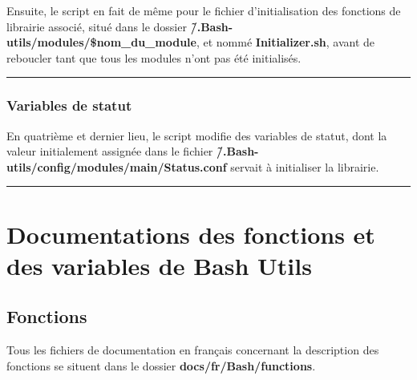 \documentclass[a4paper,10pt]{article}
\begin{document}
\begin{justify}
    Ensuite, le script en fait de même pour le fichier d'initialisation des fonctions de librairie associé, situé dans le dossier \textbf{\color{lime}\~/.Bash-utils/modules/\$nom\_du\_module}, et nommé \textbf{\color{lime}Initializer.sh}, avant de reboucler tant que tous les modules n'ont pas été initialisés.
\end{justify}



\color{blue}\par\noindent\rule{\textwidth}{0.4pt}\color{white}

\color{blue}
\subsubsection{Variables de statut}\color{white}

\begin{justify}
    En quatrième et dernier lieu, le script modifie des variables de statut, dont la valeur initialement assignée dans le fichier \textbf{\color{lime}\~/.Bash-utils/config/modules/main/Status.conf} servait à initialiser la librairie.
\end{justify}





\color{red}\par\noindent\rule{\textwidth}{0.4pt}\color{white}

\color{red}
\section{Documentations des fonctions et des variables de Bash Utils}\color{white}

\color{green}
\subsection{Fonctions}\color{white}

\begin{justify}
    Tous les fichiers de documentation en français concernant la description des fonctions se situent dans le dossier \textbf{\color{lime}docs/fr/Bash/functions}.
\end{justify}
\end{document}
